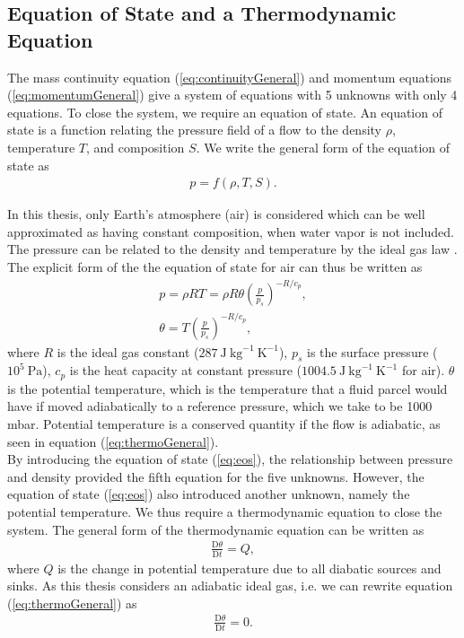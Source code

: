 \subsection{Equation of State and a Thermodynamic Equation}
\label{sec:eos}
The mass continuity equation (\ref{eq:continuityGeneral}) and momentum equations (\ref{eq:momentumGeneral}) give a system of equations with 5 unknowns with only 4 equations. To close the system, we require an equation of state. An equation of state is a function relating the pressure field of a flow to the density $\rho$, temperature $T$, and composition $S$. We write the general form of the equation of state as
\begin{align}
p = f(\rho, T, S). \label{eq:eosGeneral}
\end{align}

In this thesis, only Earth's atmosphere (air) is considered which can be well approximated as having constant composition, when water vapor is not included. The pressure can be related to the density and temperature by the ideal gas law . The explicit form of the the equation of state for air can thus be written as 
\begin{align}
p = \rho RT = \rho R \theta \left( \frac{p}{p_s} \right) ^ {-R/c_{p}}, \label{eq:eos}\\
\theta = T \left( \frac{p}{p_s} \right)^{-R/c_p}, \label{eq:potTemp}
\end{align}
where $R$ is the ideal gas constant ($287 ~\text{J}~\text{kg}^{-1}~\text{K}^{-1}$), $p_s$ is the surface pressure ($10^5 ~\text{Pa}$), $c_p$ is the heat capacity at constant pressure ($1004.5 ~\text{J}~\text{kg}^{-1}~\text{K}^{-1}$ for air). $\theta$ is the potential temperature, which is the temperature that a fluid parcel would have if moved adiabatically to a reference pressure, which we take to be 1000 mbar. Potential temperature is a conserved quantity if the flow is adiabatic, as seen in equation (\ref{eq:thermoGeneral}).\\

By introducing the equation of state (\ref{eq:eos}), the relationship between pressure and density provided the fifth equation for the five unknowns. However, the equation of state (\ref{eq:eos}) also introduced another unknown, namely the potential temperature. We thus require a thermodynamic equation to close the system. The general form of the thermodynamic equation can be written as 
\begin{align}
\frac{\text{D}\theta}{\text{D}t} = Q, \label{eq:thermoGeneral}
\end{align}
where $Q$ is the change in potential temperature due to all diabatic sources and sinks. As this thesis considers an adiabatic ideal gas, i.e. we can rewrite equation (\ref{eq:thermoGeneral}) as 
\begin{align}
\frac{\text{D}\theta}{\text{D}t} = 0.\label{eq:thermo}
\end{align}


